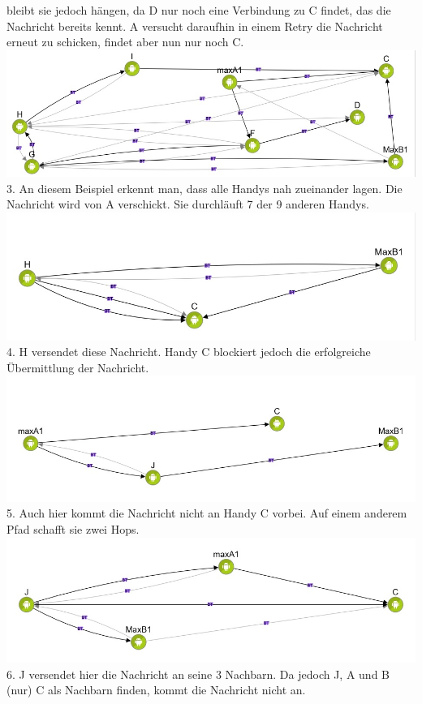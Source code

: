 bleibt sie jedoch hängen, da D nur noch eine Verbindung zu C findet, das
die Nachricht bereits kennt. A versucht daraufhin in einem Retry die
Nachricht erneut zu schicken, findet aber nun nur noch C.
\includegraphics[width=1.0\textwidth]{belege/grosstests/Bilder/Miserfolg4.jpg}\\ 3. An diesem
Beispiel erkennt man, dass alle Handys nah zueinander lagen. Die
Nachricht wird von A verschickt. Sie durchläuft 7 der 9 anderen Handys.
\includegraphics[width=1.0\textwidth]{belege/grosstests/Bilder/Miserfolg3.jpg}\\ 4. H versendet
diese Nachricht. Handy C blockiert jedoch die erfolgreiche Übermittlung
der Nachricht. \includegraphics[width=1.0\textwidth]{belege/grosstests/Bilder/Miserfolg2.jpg}\\
5. Auch hier kommt die Nachricht nicht an Handy C vorbei. Auf einem
anderem Pfad schafft sie zwei Hops.
\includegraphics[width=1.0\textwidth]{belege/grosstests/Bilder/Miserfolg1.jpg}\\ 6. J versendet
hier die Nachricht an seine 3 Nachbarn. Da jedoch J, A und B (nur) C als
Nachbarn finden, kommt die Nachricht nicht an.

